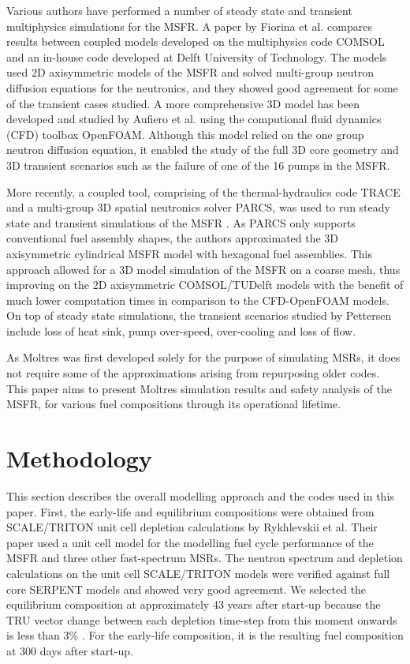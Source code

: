 \documentclass{anstrans}
\begin{document}
	Various authors have performed a number of steady state and transient
	multiphysics simulations for the \gls{MSFR}. A paper by Fiorina et al.
	\cite{fiorina_modelling_2014} compares results between coupled models
	developed on the multiphysics code COMSOL and an in-house code developed at
	Delft University of Technology. The models used 2D axisymmetric models of
	the \gls{MSFR} and solved multi-group neutron diffusion equations for the
	neutronics, and they showed good agreement for some of the transient cases
	studied. A more comprehensive 3D model has been developed and studied by
	Aufiero et al. \cite{aufiero_development_2014} using the computional fluid
	dynamics (CFD) toolbox OpenFOAM. Although this model relied on the one
	group neutron diffusion equation, it enabled the study of the full 3D core
	geometry and 3D transient scenarios such as the failure of one of the 16
	pumps in the \gls{MSFR}.

	More recently, a coupled tool, comprising of the thermal-hydraulics code
	TRACE and a multi-group 3D spatial neutronics solver \gls{PARCS}, was
	used to run steady state and transient simulations of the \gls{MSFR}
	\cite{pettersen_coupled_2016}. As \gls{PARCS} only supports conventional
	fuel assembly shapes, the authors approximated the 3D axisymmetric
	cylindrical \gls{MSFR} model with
	hexagonal fuel assemblies. This approach allowed for a 3D model
	simulation of the \gls{MSFR} on a coarse mesh, thus improving on the 2D
	axisymmetric COMSOL/TUDelft models with the benefit of much lower
	computation times in comparison to the CFD-OpenFOAM models. On top of
	steady state simulations, the transient scenarios studied by Pettersen
	include loss of heat sink, pump over-speed,
	over-cooling and loss of flow.
	
	As Moltres was first developed solely for the purpose of simulating
	\glspl{MSR}, it does not require some of the
	approximations arising from repurposing older codes.
	This paper aims to present Moltres simulation results and safety analysis
	of the \gls{MSFR}, for various fuel compositions through its operational
	lifetime.

\section{Methodology}

	This section describes the overall modelling approach and the codes used
	in this paper. First, the early-life and equilibrium compositions were
	obtained from SCALE/TRITON unit cell depletion calculations by Rykhlevskii
	et al. \cite{rykhlevskii_fuel_2019} Their paper used a unit cell model for
	the modelling
	fuel cycle performance of the \gls{MSFR} and three other fast-spectrum
	\glspl{MSR}. The neutron spectrum and depletion calculations on the unit
	cell SCALE/TRITON models were verified against full core SERPENT models and
	showed very good agreement. We selected the equilibrium composition at
	approximately 43 years after start-up because the TRU vector change
	between each depletion time-step from this moment onwards is less than 3\%
	\cite{rykhlevskii_fuel_2019}. For the early-life composition, it is the 
	resulting fuel composition at 300 days after start-up.
	
\end{document}
